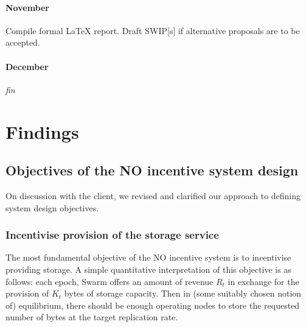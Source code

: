 \paragraph{November} Compile formal LaTeX report. Draft SWIP[s] if alternative proposals are to be accepted.

\paragraph{December} \emph{fin}




\newpage
\section*{Findings}

\begin{comment}
\subsection*{Summary}

\begin{itemize}
  \item 
  \item We studied risk of drawdowns and ruin for NOs of different sizes and its dependence on the reward lottery structure.
  \item We couched the pre-2.2 stake system and SWIPs 19 and 20 in a language of equity and options which aids intuition.
  The objective of this activity was to formulate a generalised model that incorporates current proposals and is flexible enough to provide a common language for the evaluation of future proposals.
  This framework is not yet complete.
\end{itemize}
\end{comment}

\subsection*{Objectives of the NO incentive system design}

On discussion with the client, we revised and clarified our approach to defining system design objectives.

\subsubsection*{Incentivise provision of the storage service}

The most fundamental objective of the NO incentive system is to incentivise providing storage. 
%
A simple quantitative interpretation of this objective is as follows: each epoch, Swarm offers an amount of revenue $R_t$ in exchange for the provision of $K_t$ bytes of storage capacity.
%
Then in (some suitably chosen notion of) equilibrium, there should be enough operating nodes to store the requested number of bytes at the target replication rate.

